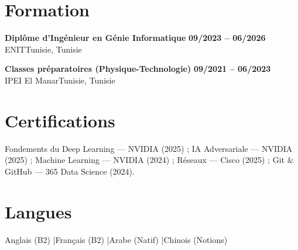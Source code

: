 \documentclass[a4paper,9pt]{article}
\newcommand{\cventry}[4]{\textbf{#1} \hfill \textbf{#4}\\[1pt]#2{\ifx\relax#3\relax\else, #3\fi}\par\vspace{1pt}}
\begin{document}
\section{Formation}
\cventry{Diplôme d'Ingénieur en Génie Informatique}{ENIT}{Tunisie}{09/2023 -- 06/2026}
\cventry{Classes préparatoires (Physique-Technologie)}{IPEI El Manar}{Tunisie}{09/2021 -- 06/2023}
\section{Certifications}
Fondements du Deep Learning --- NVIDIA (2025) ; IA Adversariale --- NVIDIA (2025) ; Machine Learning --- NVIDIA (2024) ; Réseaux --- Cisco (2025) ; Git \& GitHub --- 365 Data Science (2024).
\section{Langues}
Anglais (B2) \quad|\quad Français (B2) \quad|\quad Arabe (Natif) \quad|\quad Chinois (Notions)
\end{document}
